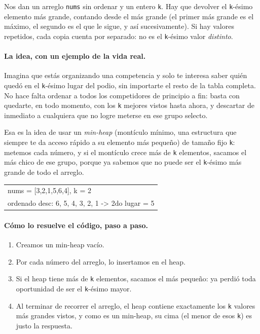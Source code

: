 
Nos dan un arreglo \texttt{nums} sin ordenar y un entero \texttt{k}. Hay que
devolver el \texttt{k}-ésimo elemento más grande, contando desde el más
grande (el primer más grande es el máximo, el segundo es el que le sigue, y
así sucesivamente). Si hay valores repetidos, cada copia cuenta por
separado: no es el \texttt{k}-ésimo valor \emph{distinto}.

\paragraph{La idea, con un ejemplo de la vida real.} Imagina que estás
organizando una competencia y solo te interesa saber quién quedó en el
\texttt{k}-ésimo lugar del podio, sin importarte el resto de la tabla
completa. No hace falta ordenar a todos los competidores de principio a fin:
basta con quedarte, en todo momento, con los \texttt{k} mejores vistos hasta
ahora, y descartar de inmediato a cualquiera que no logre meterse en ese
grupo selecto.

Esa es la idea de usar un \emph{min-heap} (montículo mínimo, una estructura
que siempre te da acceso rápido a su elemento más pequeño) de tamaño fijo
\texttt{k}: metemos cada número, y si el montículo crece más de \texttt{k}
elementos, sacamos el más chico de ese grupo, porque ya sabemos que no puede
ser el \texttt{k}-ésimo más grande de todo el arreglo.

\begin{center}
\ttfamily
\begin{tabular}{l}
nums = [3,2,1,5,6,4], k = 2\\
ordenado desc: 6, 5, 4, 3, 2, 1 -> 2do lugar = 5\\
\end{tabular}
\end{center}

\paragraph{Cómo lo resuelve el código, paso a paso.}
\begin{enumerate}
  \item Creamos un min-heap vacío.
  \item Por cada número del arreglo, lo insertamos en el heap.
  \item Si el heap tiene más de \texttt{k} elementos, sacamos el más
        pequeño: ya perdió toda oportunidad de ser el \texttt{k}-ésimo mayor.
  \item Al terminar de recorrer el arreglo, el heap contiene exactamente los
        \texttt{k} valores más grandes vistos, y como es un min-heap, su
        cima (el menor de esos \texttt{k}) es justo la respuesta.
\end{enumerate}

